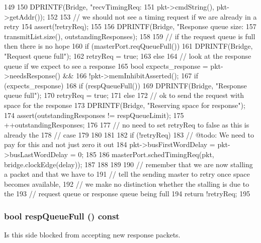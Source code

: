 \begin{DoxyCode}
149 {
150     DPRINTF(Bridge, "recvTimingReq: %
151             pkt->cmdString(), pkt->getAddr());
152 
153     // we should not see a timing request if we are already in a retry
154     assert(!retryReq);
155 
156     DPRINTF(Bridge, "Response queue size: %
157             transmitList.size(), outstandingResponses);
158 
159     // if the request queue is full then there is no hope
160     if (masterPort.reqQueueFull()) {
161         DPRINTF(Bridge, "Request queue full\n");
162         retryReq = true;
163     } else {
164         // look at the response queue if we expect to see a response
165         bool expects_response = pkt->needsResponse() &&
166             !pkt->memInhibitAsserted();
167         if (expects_response) {
168             if (respQueueFull()) {
169                 DPRINTF(Bridge, "Response queue full\n");
170                 retryReq = true;
171             } else {
172                 // ok to send the request with space for the response
173                 DPRINTF(Bridge, "Reserving space for response\n");
174                 assert(outstandingResponses != respQueueLimit);
175                 ++outstandingResponses;
176 
177                 // no need to set retryReq to false as this is already the
178                 // case
179             }
180         }
181 
182         if (!retryReq) {
183             // @todo: We need to pay for this and not just zero it out
184             pkt->busFirstWordDelay = pkt->busLastWordDelay = 0;
185 
186             masterPort.schedTimingReq(pkt, bridge.clockEdge(delay));
187         }
188     }
189 
190     // remember that we are now stalling a packet and that we have to
191     // tell the sending master to retry once space becomes available,
192     // we make no distinction whether the stalling is due to the
193     // request queue or response queue being full
194     return !retryReq;
195 }
\end{DoxyCode}
\hypertarget{classBridge_1_1BridgeSlavePort_a7ca559cfc6bcef8eba87fc5a0bd0bb42}{
\subsubsection[{respQueueFull}]{\setlength{\rightskip}{0pt plus 5cm}bool respQueueFull () const}}
\label{classBridge_1_1BridgeSlavePort_a7ca559cfc6bcef8eba87fc5a0bd0bb42}
Is this side blocked from accepting new response packets.

